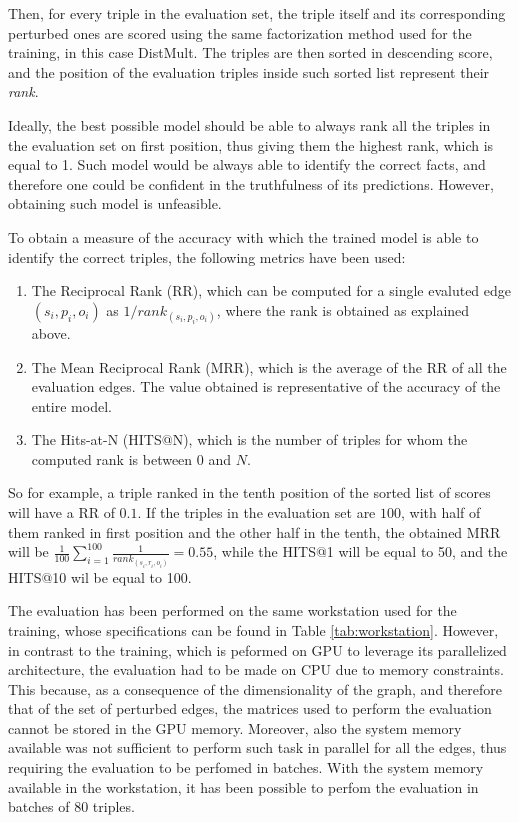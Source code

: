 \documentclass[%
    corpo=13.5pt,
    twoside,
    oldstyle,
    tipotesi=magistrale,
    greek,
    evenboxes
]{toptesi}
\begin{document}
Then, for every triple in the evaluation set, the triple itself and its
corresponding perturbed ones are scored
using the same factorization method used for the training, in this case DistMult.
The triples are then sorted in descending score, and the position of
the evaluation triples inside such sorted list represent their \emph{rank}.

Ideally, the best possible model should be able to always rank all the triples
in the evaluation set on first position, thus giving them the highest rank,
which is equal to 1.
Such model would be always able to identify the correct facts, and
therefore one could be confident in the truthfulness of its predictions.
However, obtaining such model is unfeasible.
\newline

To obtain a measure of the accuracy with which the trained model is able to
identify the correct triples, the following metrics have been used:

\begin{enumerate}
    \item The Reciprocal Rank (RR), which can be computed for a single
        evaluted edge $(s_i,p_i,o_i)$ as $1/rank_{(s_i,p_i,o_i)}$, where the
        rank is obtained as explained above.
    \item The Mean Reciprocal Rank (MRR), which is the average of the
        RR of all the evaluation edges. The value obtained is representative
        of the accuracy of the entire model.
    \item The Hits-at-N (HITS@N), which is the number of triples for whom the
        computed rank is between $0$ and $N$.
\end{enumerate}

So for example, a triple ranked in the tenth position of the sorted list of
scores will have a RR of $0.1$. If the triples in the evaluation set are $100$,
with half of them ranked in first position and the other half in the tenth, the
obtained MRR will be
$\frac{1}{100} \sum_{i=1}^{100} \frac{1}{rank_{(s_i,r_i,o_i)}} = 0.55$,
while the HITS@1 will be equal to 50, and the HITS@10 wil be
equal to 100.
\newline

The evaluation has been performed on the same workstation used for the training,
whose specifications can be found in Table \ref{tab:workstation}.
However, in contrast to the training, which is peformed on GPU to leverage its
parallelized architecture, the evaluation had to be made on CPU due to memory
constraints.
This because, as a consequence of the dimensionality of the graph, and therefore
that of the set of perturbed edges, the matrices used to perform the
evaluation cannot be stored in the GPU memory.
Moreover, also the system memory available was not sufficient to perform
such task in parallel for all the edges, thus requiring the evaluation to be
perfomed in batches.
With the system memory available in the workstation, it has been possible to
perfom the evaluation in batches of 80 triples.
\end{document}
